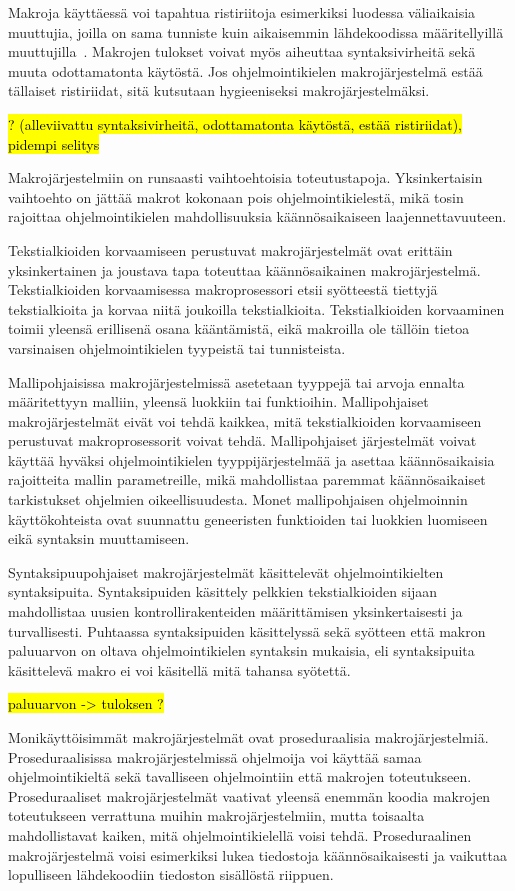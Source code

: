 Makroja käyttäessä voi tapahtua ristiriitoja esimerkiksi luodessa väliaikaisia
muuttujia, joilla on sama tunniste kuin aikaisemmin lähdekoodissa
määritellyillä muuttujilla~\citep{macrohygiene}. Makrojen tulokset voivat myös
aiheuttaa syntaksivirheitä sekä muuta odottamatonta käytöstä. Jos
ohjelmointikielen makrojärjestelmä estää tällaiset ristiriidat, sitä kutsutaan
hygieeniseksi makrojärjestelmäksi.

\hl{? (alleviivattu syntaksivirheitä, odottamatonta käytöstä, estää
ristiriidat), pidempi selitys}

Makrojärjestelmiin on runsaasti vaihtoehtoisia toteutustapoja. Yksinkertaisin
vaihtoehto on jättää makrot kokonaan pois ohjelmointikielestä, mikä tosin
rajoittaa ohjelmointikielen mahdollisuuksia käännösaikaiseen
laajennettavuuteen.

Tekstialkioiden korvaamiseen perustuvat makrojärjestelmät ovat erittäin
yksinkertainen ja joustava tapa toteuttaa käännösaikainen makrojärjestelmä.
Tekstialkioiden korvaamisessa makroprosessori etsii syötteestä tiettyjä
tekstialkioita ja korvaa niitä joukoilla tekstialkioita. Tekstialkioiden
korvaaminen toimii yleensä erillisenä osana kääntämistä, eikä makroilla ole
tällöin tietoa varsinaisen ohjelmointikielen tyypeistä tai tunnisteista.

Mallipohjaisissa makrojärjestelmissä asetetaan tyyppejä tai arvoja ennalta
määritettyyn malliin, yleensä luokkiin tai funktioihin. Mallipohjaiset
makrojärjestelmät eivät voi tehdä kaikkea, mitä tekstialkioiden korvaamiseen
perustuvat makroprosessorit voivat tehdä. Mallipohjaiset järjestelmät voivat
käyttää hyväksi ohjelmointikielen tyyppijärjestelmää ja asettaa käännösaikaisia
rajoitteita mallin parametreille, mikä mahdollistaa paremmat käännösaikaiset
tarkistukset ohjelmien oikeellisuudesta. Monet mallipohjaisen ohjelmoinnin
käyttökohteista ovat suunnattu geneeristen funktioiden tai luokkien luomiseen
eikä syntaksin muuttamiseen.

Syntaksipuupohjaiset makrojärjestelmät käsittelevät ohjelmointikielten
syntaksipuita. Syntaksipuiden käsittely pelkkien tekstialkioiden sijaan
mahdollistaa uusien kontrollirakenteiden määrittämisen yksinkertaisesti ja
turvallisesti. Puhtaassa syntaksipuiden käsittelyssä sekä syötteen että makron
paluuarvon on oltava ohjelmointikielen syntaksin mukaisia, eli syntaksipuita
käsittelevä makro ei voi käsitellä mitä tahansa syötettä.

\hl{paluuarvon -> tuloksen ?}

Monikäyttöisimmät makrojärjestelmät ovat proseduraalisia makrojärjestelmiä.
Proseduraalisissa makrojärjestelmissä ohjelmoija voi käyttää samaa
ohjelmointikieltä sekä tavalliseen ohjelmointiin että makrojen toteutukseen.
Proseduraaliset makrojärjestelmät vaativat yleensä enemmän koodia makrojen
toteutukseen verrattuna muihin makrojärjestelmiin, mutta toisaalta
mahdollistavat kaiken, mitä ohjelmointikielellä voisi tehdä. Proseduraalinen
makrojärjestelmä voisi esimerkiksi lukea tiedostoja käännösaikaisesti ja
vaikuttaa lopulliseen lähdekoodiin tiedoston sisällöstä riippuen.

